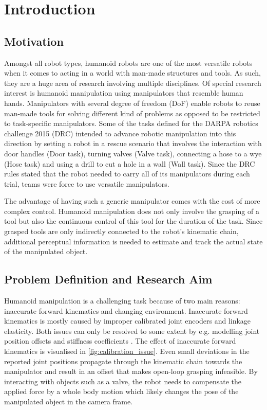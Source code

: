 \chapter{Introduction}

\section{Motivation}

Amongst all robot types, humanoid robots are one of the most versatile robots when it comes to acting in a world with man-made structures and tools. As such, they are a huge area of research involving multiple disciplines. Of special research interest is humanoid manipulation using manipulators that resemble human hands. Manipulators with several degree of freedom (DoF) enable robots to reuse man-made tools for solving different kind of problems as opposed to be restricted to task-specific manipulators. Some of the tasks defined for the DARPA robotics challenge 2015 (DRC) \cite{DRC2013} intended to advance robotic manipulation into this direction by setting a robot in a rescue scenario that involves the interaction with door handles (Door task), turning valves (Valve task), connecting a hose to a wye (Hose task) and using a drill to cut a hole in a wall (Wall task). Since the DRC rules stated that the robot needed to carry all of its manipulators during each trial, teams were force to use versatile manipulators.

The advantage of having such a generic manipulator comes with the cost of more complex control. Humanoid manipulation does not only involve the grasping of a tool but also the continuous control of this tool for the duration of the task. Since grasped tools are only indirectly connected to the robot's kinematic chain, additional perceptual information is needed to estimate and track the actual state of the manipulated object.


\section{Problem Definition and Research Aim}

Humanoid manipulation is a challenging task because of two main reasons: inaccurate forward kinematics and changing environment.
Inaccurate forward kinematics is mostly caused by improper calibrated joint encoders and linkage elasticity. Both issues can only be resolved to some extent by e.g. modelling joint position offsets \cite{Fallon2015} and stiffness coefficients \cite{Johnson2015}. The effect of inaccurate forward kinematics is visualised in \cref{fig:calibration_issue}. Even small deviations in the reported joint positions propagate through the kinematic chain towards the manipulator and result in an offset that makes open-loop grasping infeasible.
By interacting with objects such as a valve, the robot needs to compensate the applied force by a whole body motion which likely changes the pose of the manipulated object in the camera frame.

